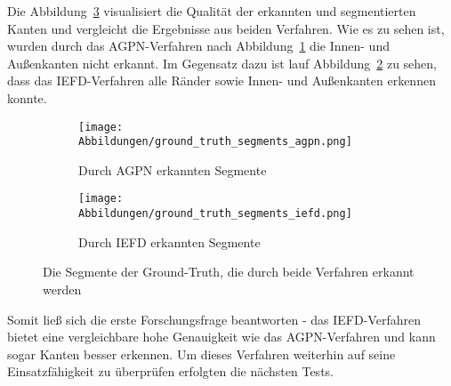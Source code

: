 Die Abbildung~\ref{fig: segments_comparision_grnd_trth} visualisiert die Qualität der erkannten und segmentierten Kanten und vergleicht die Ergebnisse aus beiden Verfahren. Wie es zu sehen ist, wurden durch das AGPN-Verfahren nach Abbildung~\ref{fig: agpn_segments_grnd_trth} die Innen- und Außenkanten nicht erkannt. Im Gegensatz dazu ist lauf Abbildung~\ref{fig: iefd_segments_grnd_trth} zu sehen, dass das IEFD-Verfahren alle Ränder sowie Innen- und Außenkanten erkennen konnte. 

\begin{figure}[h]
	\centering
	\begin{subfigure}[h]{0.49\textwidth}
		\texttt{[image: Abbildungen/ground\_truth\_segments\_agpn.png]}
		\centering
		\caption[Segmente erkannt durch das Verfahren aus der Literatur]{Durch AGPN erkannten Segmente}
		\label{fig: agpn_segments_grnd_trth}
	\end{subfigure}
	\hfil
	\begin{subfigure}[h]{0.49\textwidth}
		\texttt{[image: Abbildungen/ground\_truth\_segments\_iefd.png]}
		\centering
		\caption[Segmente erkannt durch das Verfahren dieser Arbeit]{Durch IEFD erkannten Segmente}
		\label{fig: iefd_segments_grnd_trth}
	\end{subfigure}
	\caption[Segmente der Ground-Truth Datei]{Die Segmente der Ground-Truth, die durch beide Verfahren erkannt werden}
	\label{fig: segments_comparision_grnd_trth}
\end{figure}

Somit ließ sich die erste Forschungsfrage beantworten - das IEFD-Verfahren bietet eine vergleichbare hohe Genauigkeit wie das AGPN-Verfahren und kann sogar Kanten besser erkennen. Um dieses Verfahren weiterhin auf seine Einsatzfähigkeit zu überprüfen erfolgten die nächsten Tests.


